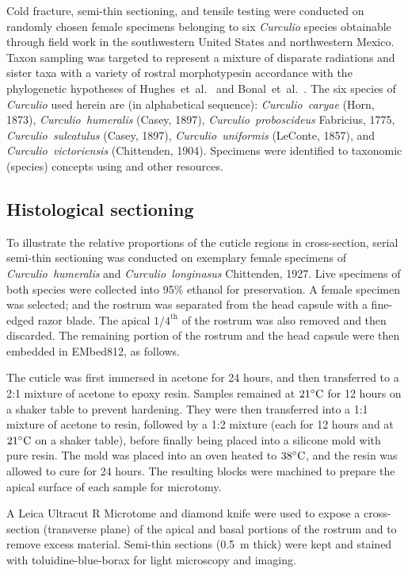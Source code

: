 \documentclass[twocolumn, linenumbers, superscriptaddress, nofootinbib]{revtex4-1}
\begin{document}
			Cold fracture, semi-thin sectioning, and tensile testing were conducted on randomly chosen female specimens belonging to six \textit{Curculio} species obtainable through field work in the southwestern United States and northwestern Mexico.
			Taxon sampling was targeted to represent a mixture of disparate radiations and sister taxa with a variety of rostral morphotypesin accordance with the phylogenetic hypotheses of Hughes~et~al.~\cite{Hughes2004eco, Hughes2004phylo} and Bonal~et~al.~\cite{Bonal2016}.
			The six species of \textit{Curculio} used herein are (in alphabetical sequence): \textit{Curculio~caryae} (Horn, 1873), \textit{Curculio~humeralis} (Casey, 1897), \textit{Curculio~proboscideus} Fabricius, 1775, \textit{Curculio~sulcatulus} (Casey, 1897), \textit{Curculio~uniformis} (LeConte, 1857), and \textit{Curculio~victoriensis} (Chittenden, 1904).
			Specimens were identified to taxonomic (species) concepts using \cite{Gibson1969} and other resources.
	
		\subsection*{Histological sectioning}
			To illustrate the relative proportions of the cuticle regions in cross-section, serial semi-thin sectioning was conducted on exemplary female specimens of \textit{Curculio~humeralis} and \textit{Curculio~longinasus} Chittenden, 1927.
			Live specimens of both species were collected into 95\% ethanol for preservation.
			A female specimen was selected; and the rostrum was separated from the head capsule with a fine-edged razor blade.
			The apical $1/4^{\text{th}}$ of the rostrum was also removed and then discarded.
			The remaining portion of the rostrum and the head capsule were then embedded in EMbed812, as follows.
			
			The cuticle was first immersed in acetone for 24 hours, and then transferred to a 2:1 mixture of acetone to epoxy resin.
			Samples remained at $21\degree\text{C}$ for 12 hours on a shaker table to prevent hardening.
			They were then transferred into a 1:1 mixture of acetone to resin, followed by a 1:2 mixture (each for 12 hours and at $21\degree\text{C}$ on a shaker table), before finally being placed into a silicone mold with pure resin.
			The mold was placed	into an oven heated to $38\degree\text{C}$, and the resin was allowed to cure for 24 hours.
			The resulting blocks were machined to prepare the apical surface of each
			sample for microtomy.
			
			A Leica Ultracut R Microtome and diamond knife were used to expose a cross-section (transverse plane) of the apical and basal portions of the rostrum and to remove excess material.
			Semi-thin sections (0.5 \,{\textmu}m thick) were kept and stained with
			toluidine-blue-borax for light microscopy and imaging.
			
\end{document}

